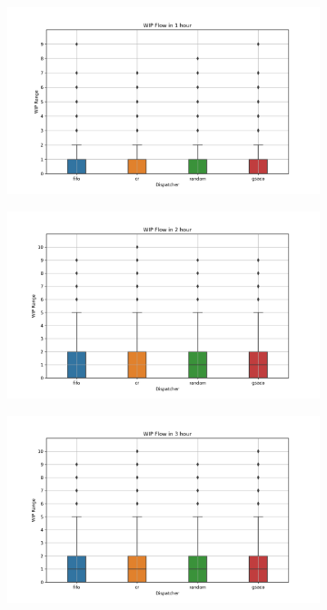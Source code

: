 \begin{figure}[t]
	\centering
	\begin{subfigure}{0.32\textwidth}
		\includegraphics[width=\textwidth]{LVHM/period_3600s.png}
	\end{subfigure}\hfill
	\begin{subfigure}{0.32\textwidth}
		\includegraphics[width=\textwidth]{LVHM/period_7200s.png}
	\end{subfigure}\hfill
	\begin{subfigure}{0.32\textwidth}
		\includegraphics[width=\textwidth]{LVHM/period_10800s.png}

\end{subfigure}
\end{figure}
